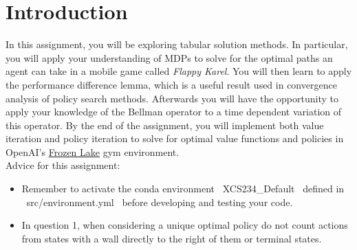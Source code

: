 \section{Introduction}

In this assignment, you will be exploring tabular solution methods. In particular, you will apply your understanding of MDPs to solve for the optimal paths an agent can take in a mobile game called \textit{Flappy Karel}. You will then learn to apply the performance difference lemma, which is a useful result used in convergence analysis of policy search methods. Afterwards you will have the opportunity to apply your knowledge of the Bellman operator to a time dependent variation of this operator. By the end of the assignment, you will implement both value iteration and policy iteration to solve for optimal value functions and policies in OpenAI's \href{https://www.gymlibrary.ml/environments/toy_text/frozen_lake/}{Frozen Lake} gym environment. \\

Advice for this assignment:
\begin{itemize}
  \item Remember to activate the conda environment ~XCS234_Default~ defined in  ~src/environment.yml~ before developing and testing your code.

  \item In question 1, when considering a unique optimal policy do not count actions from states with a wall directly to the right of them or terminal states.
\end{itemize}

